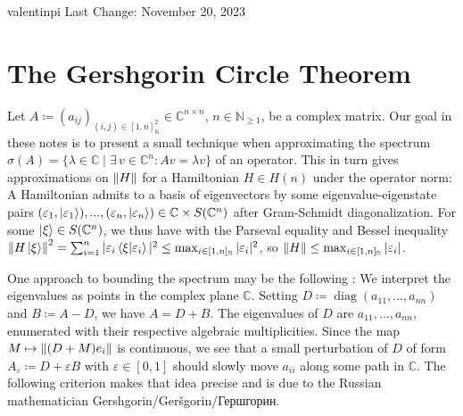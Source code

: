\documentclass[10pt]{amsart}
\theoremstyle{definition}
\theoremstyle{remark}
\DeclareMathOperator{\diag}{diag}
\begin{document}
    valentinpi \hfill Last Change: November 20, 2023

    \section*{The Gershgorin Circle Theorem}

    Let \(A \coloneqq (a_{ij})_{(i, j) \in [1, n]_{\mathbb{N}}^2} \in \mathbb{C}^{n \times n}\), \(n \in \mathbb{N}_{\geq 1}\), be a complex matrix. Our goal in these notes is to present a small technique when approximating the spectrum \(\sigma(A) = \{\lambda \in \mathbb{C} \mid \exists \, v \in \mathbb{C}^n\colon A v = \lambda v\}\) of an operator. This in turn gives approximations on \(\norm{H}\) for a Hamiltonian \(H \in H(n)\) under the operator norm: A Hamiltonian admits to a basis of eigenvectors by some eigenvalue-eigenstate pairs \((\varepsilon_1, \ket{\varepsilon_1}), ..., (\varepsilon_n, \ket{\varepsilon_n}) \in \mathbb{C} \times S(\mathbb{C}^n)\) after Gram-Schmidt diagonalization. For some \(\ket{\xi} \in S(\mathbb{C}^n)\), we thus have with the Parseval equality and Bessel inequality \(\norm{H\ket{\xi}}^2 = \sum_{i=1}^n |\varepsilon_i \braket{\xi}{\varepsilon_i}|^2 \leq \max_{i \in [1, n]_{\mathbb{N}}} |\varepsilon_i|^2\), so \(\norm{H} \leq \max_{i \in [1, n]_{\mathbb{N}}} |\varepsilon_i|\).

    One approach to bounding the spectrum may be the following \cite[pp. 387-388]{Horn}: We interpret the eigenvalues as points in the complex plane \(\mathbb{C}\). Setting \(D \coloneqq \diag(a_{11}, ..., a_{nn})\) and \(B \coloneqq A-D\), we have \(A = D + B\). The eigenvalues of \(D\) are \(a_{11}, ..., a_{nn}\), enumerated with their respective algebraic multiplicities. Since the map \(M \mapsto \norm{(D + M)e_i}\) is continuous, we see that a small perturbation of \(D\) of form \(A_\varepsilon \coloneqq D + \varepsilon B\) with \(\varepsilon \in [0, 1]\) should slowly move \(a_{ii}\) along some path in \(\mathbb{C}\). The following criterion makes that idea precise and is due to the Russian mathematician Gershgorin/Geršgorin/Гершгорин.
\end{document}
